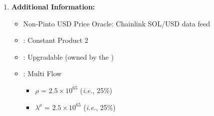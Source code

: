 \documentclass[class=article, crop=false]{standalone}
\begin{document}
\begin{enumerate}
    \item \textbf{Additional Information:}
        \begin{itemize}
            \item Non-Pinto USD Price Oracle: Chainlink SOL/USD data feed
            \item {}: Constant Product 2
            \item {}: Upgradable  (owned by the )
            \item {}: Multi Flow
                \begin{itemize}
                    \item $\rho$ = $2.5 \times 10^{65}$ (\textit{i.e.}, 25\%)
                    \item $\lambda^{\rho}$ = $2.5 \times 10^{65}$ (\textit{i.e.}, 25\%)
                \end{itemize}
        \end{itemize}
    
\end{enumerate}
\end{document}
